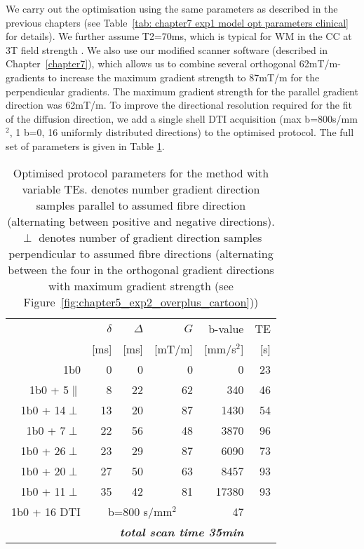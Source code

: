 We carry out the optimisation using the same parameters as described in the previous chapters (see Table~\ref{tab: chapter7 exp1 model opt parameters clinical} for details). We further assume T2=70ms, which is typical for \gls{WM} in the \gls{CC} at 3T field strength \citep{Stanisz:2005}. We also use our modified scanner software (described in Chapter~\ref{chapter7}), which allows us to combine several orthogonal 62mT/m-gradients to increase the maximum gradient strength to 87mT/m for the perpendicular gradients. The maximum gradient strength for the parallel gradient direction was 62mT/m. To improve the directional resolution required for the fit of the diffusion direction, we add a single shell DTI acquisition (max b=800s/mm$^2$, 1 b=0, 16 uniformly distributed directions) to the optimised protocol. The full set of parameters is given in Table \ref{tab:chap9 protocol table}.

\begin{table}[htbp]
  \centering
  \caption{Optimised protocol parameters for the \SFasym{} method with variable TEs. \parallel denotes number gradient direction samples parallel to assumed fibre direction (alternating between positive and negative directions). $\perp$ denotes number of gradient direction samples perpendicular to assumed fibre directions (alternating between the four in the orthogonal gradient directions with maximum gradient strength (see Figure~\ref{fig:chapter5_exp2_overplus_cartoon}))}
    \begin{tabular}{rrrrrr}
    \toprule
    	  & $\delta$ & $\Delta$ & $G$ & b-value & TE\\
          & [ms] & [ms] & [mT/m] & [mm/s$^2$] & [s]\\
    \midrule
    {1b0} & {0} & {0} & {0} & 0 & {23} \\
    {1b0 + 5$\parallel$} & {8} & {22} & {62} & 340 & {46} \\
    {1b0 + 14$\perp$} & {13} & {20} & {87} & 1430 & {54} \\
    {1b0 + 7$\perp$} & {22} & {56} & {48} & 3870 &{96} \\
    {1b0 + 26$\perp$} & {23} & {29} & {87} & 6090& {73} \\
    {1b0 + 20$\perp$} & {27} & {50} & {63} & 8457 & {93} \\
    {1b0 + 11$\perp$} & {35} & {42} & {81} & 17380 & {93} \\
    {1b0 + 16 DTI} & \multicolumn{3}{c}{{b=800 s/mm$^2$}} & {47} \\
    \midrule
    \multicolumn{5}{r}{\textit{\textbf{total scan time 35min}}} \\
    \bottomrule
    \end{tabular}%
  \label{tab:chap9 protocol table}%
\end{table}%

